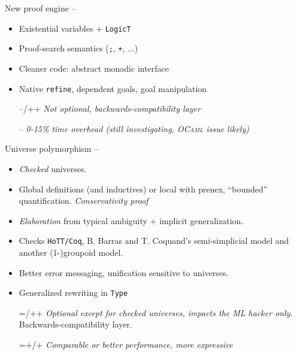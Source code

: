 
\begin{subsecframe}{New proof engine -- }

  \begin{itemize}
  \item Existential variables + \texttt{LogicT}
  \item Proof-search semantics (\texttt{;}, \texttt{+}, $\ldots$)
  \item Cleaner code: abstract monadic interface
  \item Native \texttt{refine}, dependent goals, goal manipulation
  \end{itemize}
  
  \begin{itemize}
  \item[--/++] \emph{Not optional, backwards-compatibility layer}
  \item[--] \emph{0-15\% time overhead (still investigating, \textsc{OCaml} issue likely)}
  \end{itemize}
\end{subsecframe}


\begin{subsecframe}{Universe polymorphism -- }
  \begin{itemize}
  \item \emph{Checked} universes.
  \item Global definitions (and inductives) or local with prenex, ``bounded''
    quantification. \emph{Conservativity proof}
  \item \emph{Elaboration} from typical ambiguity + implicit
    generalization.
  \item Checks \texttt{HoTT/Coq}, B. Barras and T. Coquand's semi-simplicial
    model and another (1-)groupoid model.
    \pause
  \item Better error messaging, unification sensitive to universes.
  \item Generalized rewriting in \alert{\texttt{Type}}
  \end{itemize}

  \begin{itemize}
  \item[=/++] \emph{Optional except for checked
      universes, impacts the ML hacker only}. Backwards-compatibility layer.
  \item[=+/+] \emph{Comparable or better performance, more expressive}
  \end{itemize}
\end{subsecframe}

